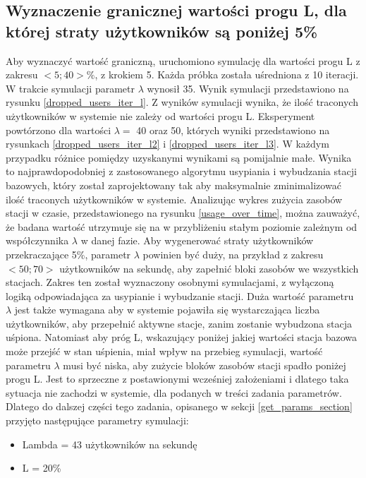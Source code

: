 \newpage
\subsection{Wyznaczenie granicznej wartości progu L, dla której straty użytkowników są poniżej 5\%}\label{drop_rate_5_section}
Aby wyznaczyć wartość graniczną, uruchomiono symulację dla wartości progu L z zakresu $<5; 40>\%$, z krokiem 5. Każda próbka została uśredniona z 10 iteracji. W trakcie symulacji parametr $\lambda$ wynosił 35. Wynik symulacji przedstawiono na rysunku \ref{dropped_users_iter_l}. Z wyników symulacji wynika, że ilość traconych użytkowników w systemie nie zależy od wartości progu L. Eksperyment powtórzono dla wartości $\lambda = $ 40 oraz 50, których wyniki przedstawiono na rysunkach \ref{dropped_users_iter_l2} i \ref{dropped_users_iter_l3}.
W każdym przypadku różnice pomiędzy uzyskanymi wynikami są pomijalnie małe. Wynika to najprawdopodobniej z zastosowanego algorytmu usypiania i wybudzania stacji bazowych, który został zaprojektowany tak aby maksymalnie zminimalizować ilość traconych użytkowników w systemie. Analizując wykres zużycia zasobów stacji w czasie, przedstawionego na rysunku \ref{usage_over_time}, można zauważyć, że badana wartość utrzymuje się na w przybliżeniu stałym poziomie zależnym od współczynnika $\lambda$ w danej fazie. Aby wygenerować straty użytkowników przekraczające 5\%, parametr $\lambda$ powinien być duży, na przykład z zakresu $<50;70>$ użytkowników na sekundę, aby zapełnić bloki zasobów we wszystkich stacjach.
Zakres ten został wyznaczony osobnymi symulacjami, z wyłączoną logiką odpowiadająca za usypianie i wybudzanie stacji. Duża wartość parametru $\lambda$ jest także wymagana aby w systemie pojawiła się wystarczająca liczba użytkowników, aby przepełnić aktywne stacje, zanim zostanie wybudzona stacja uśpiona. Natomiast aby próg L, wskazujący poniżej jakiej wartości stacja bazowa może przejść w stan uśpienia, miał wpływ na przebieg symulacji, wartość parametru $\lambda$ musi być niska, aby zużycie bloków zasobów stacji spadło poniżej progu L. Jest to sprzeczne z postawionymi wcześniej założeniami i dlatego taka sytuacja nie zachodzi w systemie, dla podanych w treści zadania parametrów. Dlatego do dalszej części tego zadania, opisanego w sekcji \ref{get_params_section} przyjęto następujące parametry symulacji:
\begin{itemize}
\item Lambda = 43 użytkowników na sekundę
\item L = 20\%
\end{itemize}

